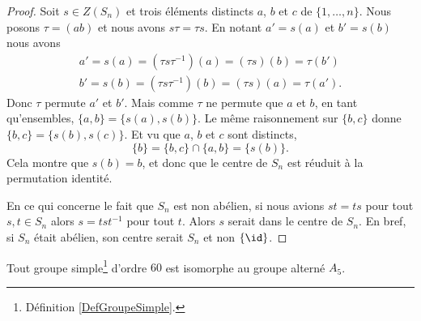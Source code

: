 \begin{proof}
    Soit \( s\in Z(S_n)\) et trois éléments distincts \( a\),  \( b\) et \( c\) de \( \{ 1,\ldots, n \}\). Nous posons \( \tau=(ab)\) et nous avons \( s\tau=\tau s\). En notant \( a'=s(a)\) et \( b'=s(b)\) nous avons
    \begin{subequations}
        \begin{align}
            a'=s(a)=(\tau s\tau^{-1})(a)=(\tau s)(b)=\tau(b')\\
            b'=s(b)=(\tau s\tau^{-1})(b)=(\tau s)(a)=\tau(a').
        \end{align}
    \end{subequations}
    Donc \( \tau\) permute \( a'\) et \( b'\). Mais comme \( \tau\) ne permute que \( a\) et \( b\), en tant qu'ensembles, \( \{ a,b \}=\{ s(a), s(b) \}\). Le même raisonnement sur \( \{ b,c \}\) donne $\{ b,c \}=\{ s(b),s(c) \}$. Et vu que \( a\), \( b\) et \( c\) sont distincts,
    \begin{equation}
        \{ b \}=\{ b,c \}\cap\{ a,b \}=\{ s(b) \}.
    \end{equation}
    Cela montre que \( s(b)=b\), et donc que le centre de \( S_n\) est réuduit à la permutation identité.

    En ce qui concerne le fait que \( S_n\) est non abélien, si nous avions \( st=ts\) pour tout \( s,t\in S_n\) alors \( s=tst^{-1}\) pour tout \( t\). Alors \( s\) serait dans le centre de \( S_n\). En bref, si \( S_n\) était abélien, son centre serait \( S_n\) et non \( \{ \id \}\).
    
\end{proof}

\begin{proposition}        \label{PROPooUBIWooTrfCat}
    Tout groupe simple\footnote{Définition \ref{DefGroupeSimple}.} d'ordre \( 60\) est isomorphe au groupe alterné \( A_5\).
\end{proposition}

